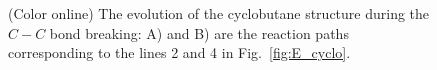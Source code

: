 \documentclass[preprint,12pt]{elsarticle}
\begin{document}
\begin{figure}[H]
\begin{center}
\begin{minipage}[h]{0.75\linewidth}
\end{minipage}
\hfill
\begin{minipage}[h]{0.75\linewidth}
\end{minipage}
\hfill 
  \caption{(Color online) The evolution of the cyclobutane structure during the $C-C$ bond breaking:  
  A) and B) are the reaction paths corresponding to the lines 2 and 4 in Fig.~\ref{fig:E_cyclo}.}
  \label{fig:paths_cyclo}
  \end{center}
\end{figure}
\end{document}
